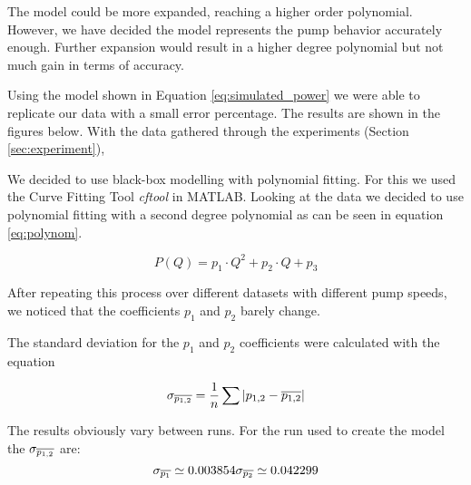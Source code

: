 The model could be more expanded, reaching a higher order polynomial. However, we have decided the model represents the pump behavior 
accurately enough. Further expansion would result in a higher degree polynomial but not much gain in terms of accuracy.

Using the model shown in Equation \ref{eq:simulated_power} we were able to replicate our data with a small error percentage. The results
are shown in the figures below.
\newpage
With the data gathered through the experiments (Section \ref{sec:experiment}),

We decided to use black-box modelling with polynomial fitting.
For this we used the Curve Fitting Tool \cite{cftool} \textit{cftool} 
 in MATLAB.
Looking at the data we decided to use polynomial fitting with a second degree polynomial
as can be seen in equation \ref{eq:polynom}.

\begin{equation}
	 P(Q) = p_1 \cdot Q^2 + p_2 \cdot Q + p_3
	 \label{eq:polynom}
\end{equation}

After repeating this process over different datasets with different pump speeds,
we noticed that the coefficients $p_1$ and $p_2$ barely change.

The standard deviation for the $p_1$ and $p_2$ coefficients were calculated with the equation 

\begin{equation}
	\sigma_{\overline{p_{1,2}}} = \dfrac{1}{n}\sum |p_{1,2}-\overline{p_{1,2}}|
	\label{eq:avedev}
\end{equation}

The results obviously vary between runs. For the run used to create the model the $\sigma_{\overline{p_{1,2}}}$ are:
\begin{equation}
	\sigma_{\mean{p_1}} \simeq 0.003854$$
	
	$$\sigma_{\mean{p_2}} \simeq 0.042299
\end{equation}

